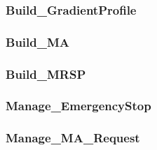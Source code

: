 \subsubsection{Build\_GradientProfile}


\subsubsection{Build\_MA}


\subsubsection{Build\_MRSP}


\subsubsection{Manage\_EmergencyStop}


\subsubsection{Manage\_MA\_Request}


\

